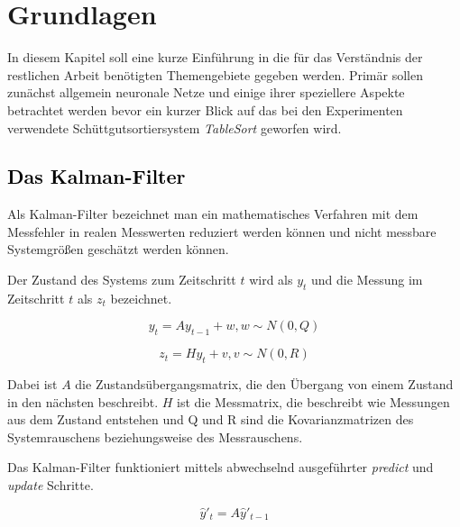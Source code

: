 \chapter{Grundlagen}




In diesem Kapitel soll eine kurze Einführung in die für das Verständnis der restlichen Arbeit benötigten Themengebiete gegeben werden.
Primär sollen zunächst allgemein neuronale Netze und einige ihrer speziellere Aspekte betrachtet werden 
bevor ein kurzer Blick auf das bei den Experimenten verwendete Schüttgutsortiersystem \textit{TableSort} geworfen wird. 

\color{blue}
\section{\textcolor{black}{Das Kalman-Filter}}
Als Kalman-Filter bezeichnet man ein mathematisches Verfahren mit dem Messfehler in realen Messwerten reduziert werden können und nicht messbare Systemgrößen geschätzt werden können. 



Der Zustand des Systems zum Zeitschritt \(t\) wird als \(y_t\) und die Messung im Zeitschritt \(t\) als \(z_t\) bezeichnet.

\begin{equation}
	y_t = A y_{t-1} + w, 	w \sim N(0, Q)
\end{equation}

\begin{equation}
	z_t = H y_{t} + v, 	v \sim N(0, R)
\end{equation}

Dabei ist \(A\) die Zustandsübergangsmatrix, die den Übergang von einem Zustand in den nächsten beschreibt.
\(H\) ist die Messmatrix, die beschreibt wie Messungen aus dem Zustand entstehen und Q und R sind die Kovarianzmatrizen des Systemrauschens beziehungsweise des Messrauschens. 

Das Kalman-Filter funktioniert mittels abwechselnd ausgeführter \textit{predict} und \textit{update} Schritte.

\begin{equation}
\hat{y}'_t = A \hat{y}'_{t-1}
\end{equation}

